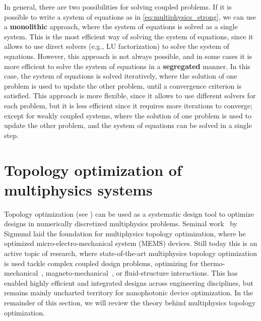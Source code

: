     In general, there are two possibilities for solving coupled problems. If it is
    possible to write a system of equations
    as in \eqref{eq:multiphysics_strong}, we can use a \textbf{monolithic}
    approach, where the system of equations is solved as a single system.
    This is the most efficient way of solving the system of equations, since it
    allows to use direct solvers (e.g., LU factorization) to solve the system of
    equations.
    However, this approach is not always possible, and in some cases it is more
    efficient to solve the system of equations in a \textbf{segregated} manner.
    In this case, the system of equations is solved iteratively, where the solution
    of one problem is used to update the other problem, until a convergence
    criterion is satisfied.
    This approach is more flexible, since it allows to use different solvers for
    each problem, but it is less efficient since it requires more iterations to
    converge;
    except for weakly coupled systems, where the solution of one problem is used to
    update the other problem, and the system of equations can be solved in a single
    step.

    \section{Topology optimization of multiphysics
      systems}\label{sec:topopt_theory}
    Topology optimization (see ) can be used as a systematic design tool to optimize designs in numerically discretized multiphysics problems. 
    Seminal work~\cite{MEMS_multi} by Sigmund laid the foundation for multiphysics topology optimization, where he optimized micro-electro-mechanical system (MEMS) devices. 
    Still today this is an active topic of research, where state-of-the-art multiphysics topology optimization is used tackle complex coupled  design problems, optimizing for thermo-mechanical~\cite{third_thermal}, magneto-mechanical~\cite{magneto}, or fluid-structure interactions. 
    This has enabled highly efficient and integrated designs across engineering disciplines, but remains mainly uncharted territory for nanophotonic device optimization. In the remainder of this section, we will review the theory behind multiphysics topology optimization.

